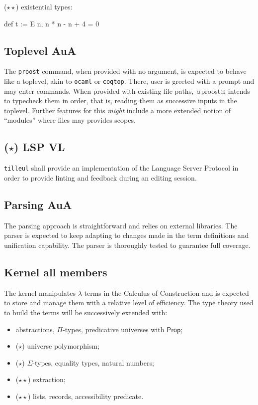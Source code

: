 \documentclass[twocolumn]{article}
\newcommand{\members}[1]{\texorpdfstring{\hfill\scriptsize #1}{}}
\newcommand{\etun}{{\color{Green} ($\star$)} }
\newcommand{\etde}{{\color{Orange} ($\star\star$)} }
\begin{document}
\etde existential types:
\begin{proost}
def t := E n, n * n - n + 4 = 0
\end{proost}


\subsection{Toplevel  \members{AuA}} The \texttt{proost} command, when provided
with no argument, is expected to behave like a toplevel, akin to \texttt{ocaml}
or \texttt{coqtop}. There, user is greeted with a prompt and may enter commands.
When provided with existing file paths, ¤proost¤ intends to typecheck them in
order, that is, reading them as successive inputs in the toplevel. Further
features for this \emph{might} include a more extended notion of ``modules''
where files may provides scopes.
\begin{center}
\end{center}


\subsection{\etun LSP \members{VL}}
\texttt{tilleul} shall provide an
implementation of the Language Server Protocol in order to provide linting and
feedback during an editing session.


\subsection{Parsing \members{AuA}}
The parsing approach is straightforward and
relies on external libraries. The parser is expected to keep adapting to changes
made in the term definitions and unification capability. The parser is
thoroughly tested to guarantee full coverage.


\subsection{Kernel \members{all members}}
The kernel manipulates
\(\lambda\)-terms in the Calculus of Construction and is expected to store and
manage them with a relative level of efficiency. The type theory used to build
the terms will be successively extended with:
\begin{itemize}
  \item abstractions, \(\Pi\)-types, predicative universes with \(\mathsf{Prop}\);
  \item \etun universe polymorphism;
  \item \etun \(\Sigma\)-types, equality types, natural numbers;
  \item \etde extraction;
  \item \etde lists, records, accessibility predicate.
\end{itemize}
\end{document}
